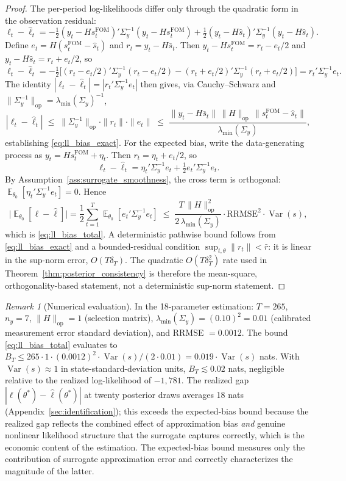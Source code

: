 \documentclass[12pt]{article}
\theoremstyle{plain}
\theoremstyle{definition}
\theoremstyle{remark}
\newtheorem{remark}[theorem]{Remark}
\DeclareMathOperator{\E}{\mathbb{E}}
\DeclareMathOperator{\Var}{\text{Var}}
\newcommand{\Sigmay}{\Sigma_y}
\begin{document}
\begin{proof}
The per-period log-likelihoods differ only through the quadratic form in the observation residual:
\[
\ell_t - \hat{\ell}_t
  = -\tfrac{1}{2}(y_t - Hs_t^{\text{FOM}})'\Sigmay^{-1}(y_t - Hs_t^{\text{FOM}})
    + \tfrac{1}{2}(y_t - H\hat{s}_t)'\Sigmay^{-1}(y_t - H\hat{s}_t).
\]
Define $e_t = H(s_t^{\text{FOM}} - \hat{s}_t)$ and $r_t = y_t - H\bar{s}_t$. Then $y_t - Hs_t^{\text{FOM}} = r_t - e_t/2$ and $y_t - H\hat{s}_t = r_t + e_t/2$, so
\[
\ell_t - \hat{\ell}_t
  = -\tfrac{1}{2}\bigl[(r_t - e_t/2)'\Sigmay^{-1}(r_t - e_t/2)
    - (r_t + e_t/2)'\Sigmay^{-1}(r_t + e_t/2)\bigr]
  = r_t'\Sigmay^{-1}e_t.
\]
The identity $|\ell_t - \hat{\ell}_t| = |r_t'\Sigmay^{-1}e_t|$ then gives, via Cauchy--Schwarz and $\|\Sigmay^{-1}\|_{\text{op}} = \lambda_{\min}(\Sigmay)^{-1}$,
\[
|\ell_t - \hat{\ell}_t|
  \;\leq\; \|\Sigmay^{-1}\|_{\text{op}} \cdot \|r_t\| \cdot \|e_t\|
  \;\leq\; \frac{\|y_t - H\bar{s}_t\|\,\|H\|_{\text{op}}\,
    \|s_t^{\text{FOM}} - \hat{s}_t\|}{\lambda_{\min}(\Sigmay)},
\]
establishing \eqref{eq:ll_bias_exact}. For the expected bias, write the data-generating process as $y_t=Hs_t^{\text{FOM}}+\eta_t$. Then $r_t=\eta_t+e_t/2$, so
\[
\ell_t-\hat{\ell}_t
  = \eta_t'\Sigmay^{-1}e_t + \tfrac{1}{2}e_t'\Sigmay^{-1}e_t.
\]
By Assumption~\ref{ass:surrogate_smoothness}, the cross term is orthogonal:
$\E_{\theta_0}[\eta_t'\Sigmay^{-1}e_t]=0$. Hence
\[
\bigl|\E_{\theta_0}[\ell - \hat{\ell}]\bigr|
  = \frac{1}{2}\sum_{t=1}^T
      \E_{\theta_0}[e_t'\Sigmay^{-1}e_t]
  \;\leq\; \frac{T\,\|H\|_{\text{op}}^2}{2\,\lambda_{\min}(\Sigmay)}
      \cdot \text{RRMSE}^2 \cdot \Var(s),
\]
which is \eqref{eq:ll_bias_total}. A deterministic pathwise bound follows from \eqref{eq:ll_bias_exact} and a bounded-residual condition $\sup_{t,\theta}\|r_t\|<\bar r$: it is linear in the sup-norm error, $O(T\delta_T)$. The quadratic $O(T\delta_T^2)$ rate used in Theorem~\ref{thm:posterior_consistency} is therefore the mean-square, orthogonality-based statement, not a deterministic sup-norm statement.
\end{proof}

\begin{remark}[Numerical evaluation]
\label{rem:numerical_bound}
In the 18-parameter estimation: $T = 265$, $n_y = 7$, $\|H\|_{\text{op}} = 1$ (selection matrix), $\lambda_{\min}(\Sigmay) = (0.10)^2 = 0.01$ (calibrated measurement error standard deviation), and RRMSE $= 0.0012$. The bound \eqref{eq:ll_bias_total} evaluates to $B_T \leq 265 \cdot 1 \cdot (0.0012)^2 \cdot \Var(s) / (2 \cdot 0.01) = 0.019 \cdot \Var(s)$ nats. With $\Var(s) \approx 1$ in state-standard-deviation units, $B_T \lesssim 0.02$ nats, negligible relative to the realized log-likelihood of $-1{,}781$. The realized gap $|\ell(\theta^*) - \hat{\ell}(\theta^*)|$ at twenty posterior draws averages 18 nats (Appendix~\ref{sec:identification}); this exceeds the expected-bias bound because the realized gap reflects the combined effect of approximation bias \emph{and} genuine nonlinear likelihood structure that the surrogate captures correctly, which is the economic content of the estimation. The expected-bias bound measures only the contribution of surrogate approximation error and correctly characterizes the magnitude of the latter.
\end{remark}
\end{document}
